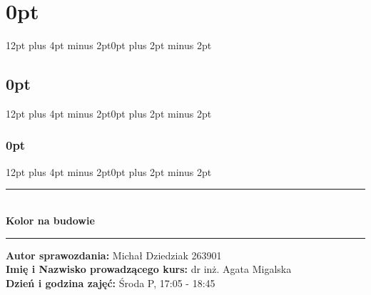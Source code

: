 % 
% 


\usepackage[margin = 0.7in]{geometry}
\usepackage{graphicx}
\usepackage{graphics}
\usepackage[T1]{fontenc}
\usepackage[polish]{babel}
\usepackage[utf8]{inputenc}
\usepackage{float}
\usepackage{tabularx}
\usepackage[table,xcdraw]{xcolor}
\usepackage{lipsum}
\usepackage{titlesec}
\usepackage{minted}
\usepackage{xcolor}
\usepackage{caption}
\usepackage{enumitem}
\usepackage{csvsimple}
\usepackage{blindtext}
\usepackage{numprint} %
\usepackage[round-precision=3,round-mode=figures, scientific-notation=true]{siunitx} %
\usepackage[hidelinks]{hyperref}
\usepackage{url}
\usepackage{bm} %
\usepackage[]{booktabs}
\usepackage{tabularray}
\usepackage{multirow}

\author{Michał Dziedziak}
\date{\today}


\titlespacing\section{0pt}{12pt plus 4pt minus 2pt}{0pt plus 2pt minus 2pt}
\titlespacing\subsection{0pt}{12pt plus 4pt minus 2pt}{0pt plus 2pt minus 2pt}
\titlespacing\subsubsection{0pt}{12pt plus 4pt minus 2pt}{0pt plus 2pt minus 2pt}
\setlength{\parskip}{\baselineskip}%
\setlength{\parindent}{0pt}%

\newcommand{\squeezeup}{\vspace{-5mm}}




\begin{titlepage}
    \begin{center}
        \vspace*{5cm}
        \rule{500pt}{1pt}\\
        \vspace*{0.5cm}
        \LARGE
        \textbf{Kolor na budowie}\\
        \Large
        \vspace*{0.5cm}
        \rule{500pt}{1pt}
    \end{center}

    \vspace*{10cm}

    {\raggedright
        \large
        \textbf{Autor sprawozdania:} Michał Dziedziak 263901\\
        \textbf{Imię i Nazwisko prowadzącego kurs:} dr inż. Agata Migalska\\
        \textbf{Dzień i godzina zajęć:} Środa P, 17:05 - 18:45
    }
\end{titlepage}


